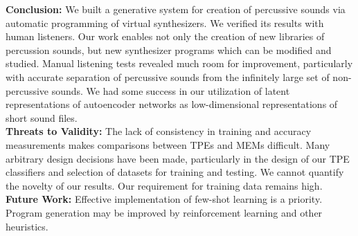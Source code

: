 \documentclass[runningheads,a4paper]{llncs}
\begin{document}
\textbf{Conclusion:} We built a generative system for creation of percussive sounds via automatic programming of virtual synthesizers. We verified its results with human listeners.
Our work enables not only the creation of new libraries of percussion sounds, but new synthesizer programs which can be modified and studied. 
Manual listening tests revealed much room for improvement, particularly with accurate separation of percussive sounds from the infinitely large set of non-percussive sounds. We had some success in our utilization of latent representations of autoencoder networks as low-dimensional representations of short sound files. \\ 
\textbf{Threats to Validity:} The lack of consistency in training and accuracy measurements makes comparisons between TPEs and MEMs difficult. Many arbitrary design decisions have been made, particularly in the design of our TPE classifiers and selection of datasets for training and testing. We cannot quantify the novelty of our results. Our requirement for training data remains high. \\
\textbf{Future Work:} Effective implementation of few-shot learning is a priority. Program generation may be improved by reinforcement learning and other heuristics.




\end{document}
